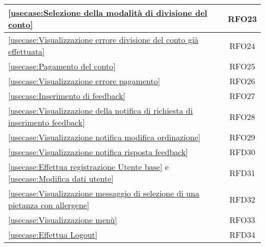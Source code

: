 \begin{longtable}{|l|c|}
	\hline
	\autoref{usecase:Selezione della modalità di divisione del conto}                                                                                            & RFO23                  \\
	\hline
	\autoref{usecase:Visualizzazione errore divisione del conto già effettuata}                                                                                  & RFO24                  \\
	\hline
	\autoref{usecase:Pagamento del conto}                                                                                                                        & RFO25                  \\
	\hline
	\autoref{usecase:Visualizzazione errore pagamento}                                                                                                           & RFO26                  \\
	\hline
	\autoref{usecase:Inserimento di feedback}                                                                                                                    & RFO27                  \\
	\hline
	\autoref{usecase:Visualizzazione della notifica di richiesta di inserimento feedback}                                                                        & RFO28                  \\
	\hline
	\autoref{usecase:Visualizzazione notifica modifica ordinazione}                                                                                              & RFO29                  \\
	\hline
	\autoref{usecase:Visualizzazione notifica risposta feedback}                                                                                                 & RFD30                  \\
	\hline
	\autoref{usecase:Effettua registrazione Utente base} e \autoref{usecase:Modifica dati utente}                                                                & RFD31                  \\
	\hline
	\autoref{usecase:Visualizzazione messaggio di selezione di una pietanza con allergene}                                                                       & RFD32                  \\
	\hline
	\autoref{usecase:Visualizzazione menù}                                                                                                                       & RFO33                  \\
	\hline
	\autoref{usecase:Effettua Logout}                                                                                                                            & RFD34                  \\

\end{longtable}
